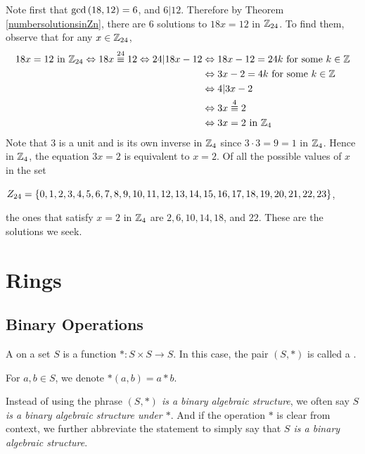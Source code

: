 \documentclass[11pt,fleqn,dvipsnames,usenames]{article}
\begin{document}
\begin{solution}
Note first that $\text{gcd}\left(18,12\right) = 6$, and $6|12$.  Therefore by Theorem \ref{numbersolutionsinZn}, there are $6$ solutions to $18x=12$ in $\mathbb{Z}_{24}$.  To find them, observe that for any $x\in\mathbb{Z}_{24}$,
\begin{align*}
18x = 12\text{ in }\mathbb{Z}_{24} \Leftrightarrow 18x\overset{24}{\equiv}12 \Leftrightarrow 24|18x - 12 &\Leftrightarrow 18x - 12 = 24k\text{ for some }k\in\mathbb{Z}\\
&\Leftrightarrow 3x - 2 = 4k\text{ for some }k\in\mathbb{Z}\\
&\Leftrightarrow 4|3x - 2\\
&\Leftrightarrow 3x\overset{4}{\equiv}2\\
&\Leftrightarrow 3x = 2\text{ in }\mathbb{Z}_{4} 
\end{align*}
Note that $3$ is a unit and is its own inverse in $\mathbb{Z}_4$ since $3\cdot 3 = 9 = 1$ in $\mathbb{Z}_4$.  Hence in $\mathbb{Z}_4$, the equation $3x=2$ is equivalent to $x = 2$.  Of all the possible values of $x$ in the set
\begin{center}
$Z_{24} = \left\{0,1,2,3,4,5,6,7,8,9,10,11,12,13,14,15,16,17,18,19,20,21,22,23\right\}$,
\end{center}
the ones that satisfy $x = 2$ in $\mathbb{Z}_4$ are $2,6,10,14,18$, and $22$.  These are the solutions we seek.
\end{solution}
%
\section{Rings}
\subsection{Binary Operations}
%
\begin{definition}
A  on a set $S$ is a function $*:S\times S\to S$.  In this case, the pair $(S,*)$ is called a .
\end{definition}

\notation For $a,b\in S$, we denote $*(a,b) = a * b$.

\begin{remark}
Instead of using the phrase \emph{$(S,*)$ is a binary algebraic structure}, we often say \emph{$S$ is a binary algebraic structure under $*$}.  And if the operation $*$ is clear from context, we further abbreviate the statement to simply say that \emph{$S$ is a binary algebraic structure}.
\end{remark}
\end{document}
